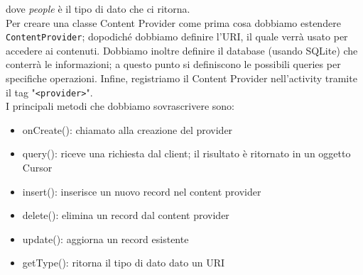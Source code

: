 dove \textit{people} è il tipo di dato che ci ritorna.\\
Per creare una classe Content Provider come prima cosa dobbiamo estendere
\texttt{ContentProvider}; dopodiché dobbiamo definire l'URI, il quale verrà
usato per accedere ai contenuti. Dobbiamo inoltre definire il database (usando
SQLite) che conterrà le informazioni; a questo punto si definiscono le
possibili queries per specifiche operazioni. Infine, registriamo il Content
Provider nell'activity tramite il tag "\texttt{<provider>}".\\
I principali metodi che dobbiamo sovrascrivere sono:
\begin{itemize}
    \item onCreate(): chiamato alla creazione del provider
    \item query(): riceve una richiesta dal client; il risultato è ritornato in
un oggetto Cursor
    \item insert(): inserisce un nuovo record nel content provider
    \item delete(): elimina un record dal content provider
    \item update(): aggiorna un record esistente
    \item getType(): ritorna il tipo di dato dato un URI
\end{itemize}
% 
